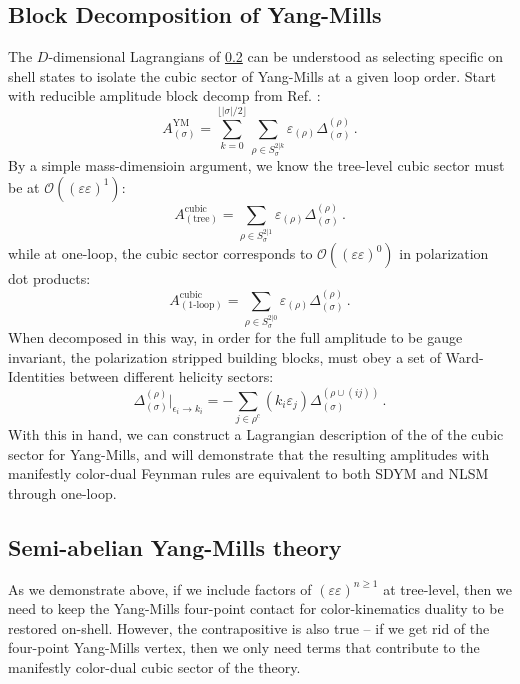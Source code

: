 \documentclass[11pt,letter]{article}
\def\be{\begin{equation}}
\def\ee{\end{equation}}
\begin{document}
\subsection{Block Decomposition of Yang-Mills}
The $D$-dimensional Lagrangians of \ref{} can be understood as selecting specific on shell states to isolate the cubic sector of Yang-Mills at a given loop order. Start with reducible amplitude block decomp from Ref. \cite{Pavao:2022kog}:
\begin{equation}\label{eq:pureVecRABD}
A_{(\sigma)}^{\text{YM}} = \sum_{k=0}^{\lfloor |\sigma|/2\rfloor}\sum_{\rho \in S^{2|k}_{\sigma}}\varepsilon_{(\rho)} \Delta_{(\sigma)}^{(\rho)}\,.
\end{equation}
By a simple mass-dimensioin argument, we know the tree-level cubic sector must be at $\mathcal{O}((\varepsilon\varepsilon)^1)$:
\be
A_{(\text{tree})}^{\text{cubic}} = \sum_{\rho \in S^{2|1}_{\sigma}}\varepsilon_{(\rho)} \Delta_{(\sigma)}^{(\rho)}\,.
\ee
while at one-loop, the cubic sector corresponds to $\mathcal{O}((\varepsilon\varepsilon)^0)$ in polarization dot products:
\be
A_{(\text{1-loop})}^{\text{cubic}} = \sum_{\rho \in S^{2|0}_{\sigma}}\varepsilon_{(\rho)} \Delta_{(\sigma)}^{(\rho)}\,.
\ee
When decomposed in this way, in order for the full amplitude to be gauge invariant, the polarization stripped building blocks, must obey a set of Ward-Identities between different helicity sectors:
 \begin{equation}\label{eq:GIrelA}
\Delta_{(\sigma)}^{(\rho)}\Big|_{\epsilon_i\rightarrow k_i} =-
\sum_{j \in \rho^c} (k_i \varepsilon_j)\Delta_{(\sigma )}^{(\rho\cup (ij))} \,.
\end{equation}
With this in hand, we can construct a Lagrangian description of the of the cubic sector for Yang-Mills, and will demonstrate that the resulting amplitudes with manifestly color-dual Feynman rules are equivalent to both SDYM and NLSM through one-loop. 
\subsection{Semi-abelian Yang-Mills theory}
As we demonstrate above, if we include factors of $(\varepsilon\varepsilon)^{n\geq 1}$ at tree-level, then we need to keep the Yang-Mills four-point contact for color-kinematics duality to be restored on-shell. However, the contrapositive is also true -- if we get rid of the four-point Yang-Mills vertex, then we only need terms that contribute to the manifestly color-dual cubic sector of the theory. 
\end{document}
